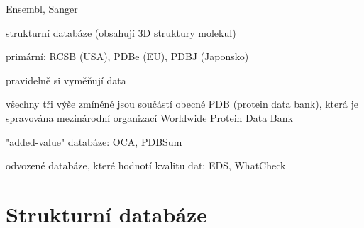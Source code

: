 \documentclass[DIV=8]{scrreprt}
\begin{document}
\begin{myItemize}[nosep]
\begin{myItemize}[nosep]
    \item Ensembl, Sanger
\end{myItemize}

    \item strukturní databáze (obsahují 3D struktury molekul)
\begin{myItemize}[nosep]
    \item primární: RCSB (USA), PDBe (EU), PDBJ (Japonsko)
\begin{myItemize}[nosep]
    \item pravidelně si vyměňují data
    \item všechny tři výše zmíněné jsou součástí obecné PDB (protein data bank), která je spravována mezinárodní organizací Worldwide Protein Data Bank
\end{myItemize}

    \item "added-value" databáze: OCA, PDBSum
    \item odvozené databáze, které hodnotí kvalitu dat: EDS, WhatCheck
\end{myItemize}

\end{myItemize}



\section{Strukturní databáze} \label{Strukturní databáze} \FloatBarrier
\end{document}
